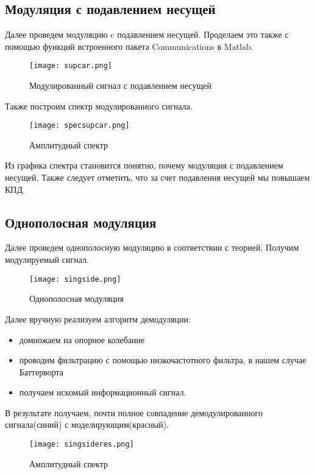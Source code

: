    
\subsection{Модуляция с подавлением несущей}
Далее проведем модуляцию c подавлением несущей.
Проделаем это также с помощью функций встроенного пакета Communications в Matlab.
	
\begin{figure}[H]
	\begin{center}
		\texttt{[image: supcar.png]}
		\caption{Модулированный сигнал с подавлением несущей} 
		\label{pic:pic01} %
	\end{center}
\end{figure} 
Также построим спектр модулированного сигнала.
\begin{figure}[H]
	\begin{center}
		\texttt{[image: specsupcar.png]}
		\caption{Амплитудный спектр} 
		\label{pic:pic02} %
	\end{center}
\end{figure} 
Из графика спектра становится понятно, почему модуляция с подавлением несущей.
Также следует отметить, что за счет подавления несущей мы повышаем КПД.  

\subsection{Однополосная модуляция}
Далее проведем однополосную модуляцию в соответствии с теорией.
Получим модулируемый сигнал.
\begin{figure}[H]
	\begin{center}
		\texttt{[image: singside.png]}
		\caption{Однополосная модуляция} 
		\label{pic:pic02} %
	\end{center}
\end{figure} 
Далее вручную реализуем алгоритм демодуляции:

\begin{itemize}
	\item домножаем на опорное колебание 
	\item проводим фильтрацию с помощью низкочастотного фильтра, в нашем случае Баттерворта 
	\item получаем искомый информационный сигнал.
\end{itemize}
В результате получаем, почти полное совпадение демодулированного сигнала(синий) с моделирующим(красный).
\begin{figure}[H]
	\begin{center}
		\texttt{[image: singsideres.png]}
		\caption{Амплитудный спектр} 
		\label{pic:pic02} %
	\end{center}
\end{figure}    

